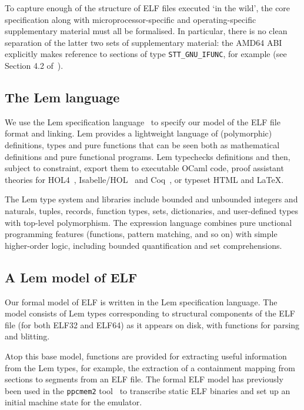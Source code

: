 To capture enough of the structure of ELF files executed `in the wild', the core specification along with microprocessor-specific and operating-specific supplementary material must all be formalised.
In particular, there is no clean separation of the latter two sets of supplementary material: the AMD64 ABI explicitly makes reference to sections of type \texttt{STT\_GNU\_IFUNC}, for example (see Section 4.2 of~\cite{amd64-abi}).

\subsection{The Lem language}
\label{subsect.rigorous.lem.specification}

We use the Lem specification language~\cite{mulligan-lem-2014} to specify our model of the ELF file format and linking.
Lem provides a lightweight language of (polymorphic) definitions, types and pure functions that can be seen both as mathematical definitions and pure functional programs.
Lem typechecks definitions and then, subject to constraint, export them to executable OCaml code, proof assistant theories for HOL4~\cite{slind-brief-2008}, Isabelle/HOL~\cite{wenzel-isabelle-2008} and Coq~\cite{bertot-short-2008}, or typeset HTML and LaTeX.

The Lem type system and libraries include bounded and unbounded integers and naturals, tuples, records, function types, sets, dictionaries, and user-defined types with top-level polymorphism.
The expression language combines pure unctional programming features (functions, pattern matching, and so on) with simple higher-order logic, including bounded quantification and set comprehensions.

\subsection{A Lem model of ELF}
\label{subsect.lem.model.of.elf}

Our formal model of ELF is written in the Lem specification language.
The model consists of Lem types corresponding to structural components of the ELF file (for both ELF32 and ELF64) as it appears on disk, with functions for parsing and blitting.

Atop this base model, functions are provided for extracting useful information from the Lem types, for example, the extraction of a containment mapping from sections to segments from an ELF file.
The formal ELF model has previously been used in the \texttt{ppcmem2} tool~\cite{gray-integrated-2015} to transcribe static ELF binaries and set up an initial machine state for the emulator.

